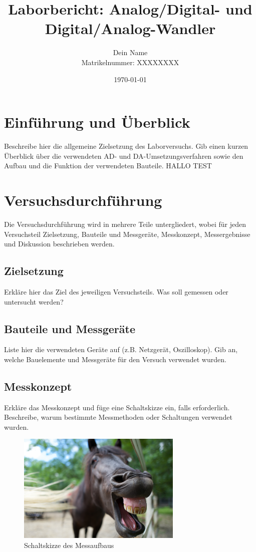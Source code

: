 \documentclass[a4paper,12pt]{article}
\title{Laborbericht: Analog/Digital- und Digital/Analog-Wandler}
\author{Dein Name \\ Matrikelnummer: XXXXXXXX}
\date{\today}
\begin{document}
\maketitle

\tableofcontents
\newpage

\section{Einführung und Überblick}
Beschreibe hier die allgemeine Zielsetzung des Laborversuchs. Gib einen kurzen Überblick über die verwendeten AD- und DA-Umsetzungsverfahren sowie den Aufbau und die Funktion der verwendeten Bauteile. HALLO TEST

\section{Versuchsdurchführung}
Die Versuchsdurchführung wird in mehrere Teile untergliedert, wobei für jeden Versuchsteil Zielsetzung, Bauteile und Messgeräte, Messkonzept, Messergebnisse und Diskussion beschrieben werden. 

\subsection{Zielsetzung}
Erkläre hier das Ziel des jeweiligen Versuchsteils. Was soll gemessen oder untersucht werden?

\subsection{Bauteile und Messgeräte}
Liste hier die verwendeten Geräte auf (z.B. Netzgerät, Oszilloskop). Gib an, welche Bauelemente und Messgeräte für den Versuch verwendet wurden.

\subsection{Messkonzept}
Erkläre das Messkonzept und füge eine Schaltskizze ein, falls erforderlich. Beschreibe, warum bestimmte Messmethoden oder Schaltungen verwendet wurden.

\begin{figure}[H]
    \centering
    \includegraphics[width=0.7\textwidth]{Schaltskizze.jpg} %
    \caption{Schaltskizze des Messaufbaus}
\end{figure}
\end{document}
